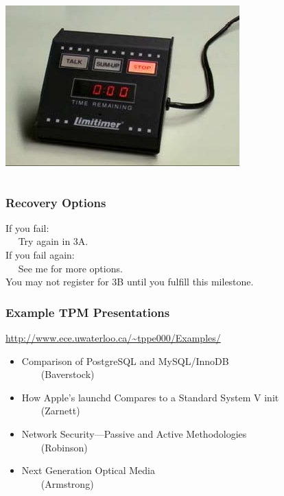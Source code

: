 \documentclass{beamer}
\begin{document}
\begin{frame}
\begin{columns}[c]
\includegraphics[width=\columnwidth]{stop}
\end{columns}

\end{frame}

\begin{frame}

\frametitle{Recovery Options}

If you fail: \\
$\quad$ Try again in 3A.\\[2em]

If you fail again:\\
$\quad$ See me for more options.\\[2em]

You may not register for 3B until you fulfill this milestone.

\end{frame}

\begin{frame}

\frametitle{Example TPM Presentations}

\url{http://www.ece.uwaterloo.ca/~tppe000/Examples/}

\small
\begin{itemize}
\item Comparison of PostgreSQL and MySQL/InnoDB\\
$\qquad$(Baverstock)
\item How Apple's launchd Compares to a Standard System V init\\
$\qquad$(Zarnett)
\item Network Security---Passive and Active Methodologies\\
$\qquad$(Robinson)
\item Next Generation Optical Media\\
$\qquad$(Armstrong)
\end{itemize}



\end{frame}
\end{document}
